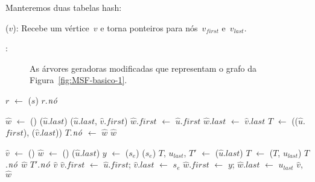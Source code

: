 Manteremos duas tabelas hash:

\hashNP($v$): Recebe um vértice~$v$ e torna ponteiros para nós~$v_{first}$ e~$v_{last}$.

\hashEdges:

\begin{figure}[htb]
\scalebox{1.5}{
\centering

}
\caption{As árvores geradoras modificadas que representam o grafo da Figura~\ref{fig:MSF-basico-1}.}
\label{fig:MSF-figura-4}
\end{figure}


\begin{algorithm}[htb]
\caption{\LCOFindNode($s$)}
\label{Algo:LCOFindNode}
\begin{algorithmic}[1]
\State $r$ $\gets$ \treapGetRoot($s$)
\State \Return $r$.$\mathit{n\acute{o}}$
\end{algorithmic}
\end{algorithm}


\begin{algorithm}[htb]
\caption{\LCOMerge($\hat u$, $\hat v$)}
\label{Algo:LCOMerge}
\begin{algorithmic}[1]
\State $\hat w$ $\gets$ \LCOMakeNode()
\State \linkcutEvert($\hat u$.$last$)
\State \linkcutAddEdge($\hat u$.$last$, $\hat v$.$first$)
\State $\hat w$.$first$  $\gets$ $\hat u$.$first$
\State $\hat w$.$last$  $\gets$ $\hat v$.$last$
\State $T$ $\gets$ \treapJoin(\treapGetRoot($\hat u$.$first$), \treapGetRoot($\hat v$.$last$))
\State $T$.$\mathit{n\acute{o}}$ $\gets$ $\hat w$
\State \Return $\hat w$
\end{algorithmic}
\end{algorithm}


\begin{algorithm}[htb]
\caption{\LCOSplit($\hat u$, $s_e$)}
\label{Algo:LCOSplit}
\begin{algorithmic}[1]
\State $\hat v$ $\gets$ \LCOMakeNode()
\State $\hat w$ $\gets$ \LCOMakeNode()
\State \linkcutEvert($\hat u$.$last$)
\State $y$ $\gets$ \linkcutParent($s_e$)
\State \linkcutDelEdge($s_e$)
\State $T$, $u_{last}$, $T'$ $\gets$ \treapSplit($\hat u$.$last$)
\State $T$ $\gets$ \treapJoin($T$, $u_{last}$)
\State $T$.$\mathit{n\acute{o}}$ $\hat w$
\State $T'$.$\mathit{n\acute{o}}$ $\hat v$
\State $\hat v$.$first$ $\gets$ $\hat u$.$first$; $\hat v$.$last$ $\gets$ $s_e$
\State $\hat w$.$first$ $\gets$ $y$; $\hat w$.$last$ $\gets$ $u_{last}$
\State \Return $\hat v$, $\hat w$
\end{algorithmic}
\end{algorithm}


